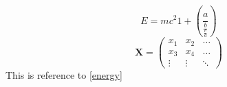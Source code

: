 \documentclass{ctexart}
\begin{document}
\begin{equation}
E = mc^2 \label{energy}
1+\left(\frac{a}{\frac{b}{\frac{c}{d}}}\right)
\end{equation}
\[
\mathbf{X} = \left(
\begin{array}{ccc}
x_1 & x_2 & \ldots \\
x_3 & x_4 & \ldots \\
\vdots & \vdots & \ddots
\end{array} \right)
\]
This is reference to \eqref{energy}
\end{document}
